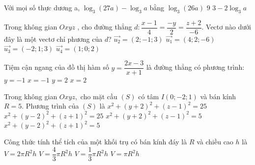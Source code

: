 \begin{ex}%
	Với mọi số thực dương a, $\log_3\left(27a\right)-\log_3a$ bằng
	\choice
	{$\log_3\left(26a\right)$}
	{$9$}
	{}
	{$3-2\log_3a$}
\end{ex}

\begin{ex}%
	Trong không gian $Oxyz$ , cho đường thẳng $d:\dfrac{x-1}{4}=\dfrac{-y}{2}=\dfrac{z+2}{-6}$. Vectơ nào dưới đây là một vectơ chỉ phương của $d$?
	\choice
	{$\overrightarrow{u_2}=\left(2;-1;3\right)$}
	{$\overrightarrow{u_1}=\left(4;2;-6\right)$}
	{\True $\overrightarrow{u_3}=\left(-2;1;3\right)$}
	{$\overrightarrow{u_4}=\left(1;0;2\right)$}
\end{ex}

\begin{ex}%
	Tiệm cận ngang của đồ thị hàm số $y=\dfrac{2x-3}{x+1}$ là đường thẳng có phương trình:
	\choice
	{$y=-1$}
	{$x=-1$}
	{\True $y=2$}
	{$x=2$}
\end{ex}

\begin{ex}%
	Trong không gian $Oxyz,$ cho mặt cầu $(S)$ có tâm $I\left(0;-2;1\right)$ và bán kính $R=5$. Phương trình của $(S)$ là
	\choice
	{\True $x^2+\left(y+2\right)^2+\left(z-1\right)^2=25$}
	{$x^2+\left(y-2\right)^2+\left(z+1\right)^2=25$}
	{$x^2+\left(y+2\right)^2+\left(z-1\right)^2=5$}
	{$x^2+\left(y-2\right)^2+\left(z+1\right)^2=5$}
\end{ex}

\begin{ex}%
	Công thức tính thể tích của một khối trụ có bán kính đáy là $R$ và chiều cao $h$ là
	\choice
	{$V=2\pi{R^2}h$}
	{$V=\dfrac{4}{3}\pi{R^2}h$}
	{$V=\dfrac{1}{3}\pi{R^2}h$}
	{\True $V=\pi{R^2}h$}
\end{ex}

